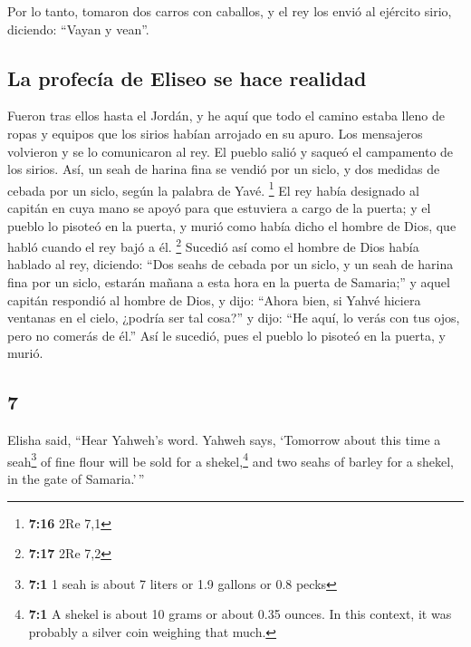\begin{paracol}{2}
 Por lo tanto, tomaron dos carros con caballos, y el rey
los envió al ejército sirio, diciendo: ``Vayan y vean''.

\hypertarget{la-profecuxeda-de-eliseo-se-hace-realidad}{%
\subsection{La profecía de Eliseo se hace
realidad}\label{la-profecuxeda-de-eliseo-se-hace-realidad}}

 Fueron tras ellos hasta el Jordán, y he aquí que todo el
camino estaba lleno de ropas y equipos que los sirios habían arrojado en
su apuro. Los mensajeros volvieron y se lo comunicaron al rey.
 El pueblo salió y saqueó el campamento de los sirios.
Así, un seah de harina fina se vendió por un siclo, y dos medidas de
cebada por un siclo, según la palabra de Yavé. \footnote{\textbf{7:16}
  2Re 7,1}  El rey había designado al capitán en cuya
mano se apoyó para que estuviera a cargo de la puerta; y el pueblo lo
pisoteó en la puerta, y murió como había dicho el hombre de Dios, que
habló cuando el rey bajó a él. \footnote{\textbf{7:17} 2Re 7,2}
 Sucedió así como el hombre de Dios había hablado al rey,
diciendo: ``Dos seahs de cebada por un siclo, y un seah de harina fina
por un siclo, estarán mañana a esta hora en la puerta de Samaria;''
 y aquel capitán respondió al hombre de Dios, y dijo:
``Ahora bien, si Yahvé hiciera ventanas en el cielo, ¿podría ser tal
cosa?'' y dijo: ``He aquí, lo verás con tus ojos, pero no comerás de
él.''  Así le sucedió, pues el pueblo lo pisoteó en la
puerta, y murió.

\switchcolumn
\begin{otherlanguage}{english}

\hypertarget{section-13}{%
\section{7}\label{section-13}}

 Elisha said, ``Hear Yahweh's word. Yahweh says, `Tomorrow
about this time a seah\footnote{\textbf{7:1} 1 seah is about 7 liters or
  1.9 gallons or 0.8 pecks} of fine flour will be sold for a
shekel,\footnote{\textbf{7:1} A shekel is about 10 grams or about 0.35
  ounces. In this context, it was probably a silver coin weighing that
  much.} and two seahs of barley for a shekel, in the gate of
Samaria.'\,''


\end{otherlanguage}
\end{paracol}
